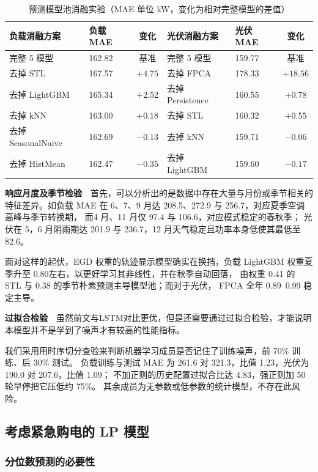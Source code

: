 \documentclass[zihao=-4,a4paper,fontset=none]{ctexart}
\begin{document}
\begin{table}[htbp]
\centering
\caption{预测模型池消融实验（MAE 单位 kW，变化为相对完整模型的差值）}
{\small
\begin{tabular}{llcllc}
\toprule
负载消融方案 & 负载MAE & 变化 & 光伏消融方案 & 光伏MAE & 变化 \\
\midrule
完整 5 模型 & 162.82 & 基准 & 完整 5 模型 & 159.77 & 基准 \\
去掉 STL & 167.57 & $+4.75$ & 去掉 FPCA & 178.33 & $+18.56$ \\
去掉 LightGBM & 165.34 & $+2.52$ & 去掉 Persistence & 160.55 & $+0.78$ \\
去掉 kNN & 163.00 & $+0.18$ & 去掉 STL & 160.32 & $+0.55$ \\
去掉 SeasonalNaive & 162.69 & $-0.13$ & 去掉 kNN & 159.71 & $-0.06$ \\
去掉 HistMean & 162.47 & $-0.35$ & 去掉 LightGBM & 159.60 & $-0.17$ \\
\bottomrule
\end{tabular}}
\label{tab:p2fablate}
\end{table}
\textbf{响应月度及季节检验}\ \ 
首先，可以分析出的是数据中存在大量与月份或季节相关的特征差异。如负载 MAE 在 6、7、9 月达 208.5、272.9 与 256.7，对应夏季空调高峰与季节转换期，
而4 月、11 月仅 97.4 与 106.6，对应模式稳定的春秋季；
光伏在 5，6 月阴雨期达 201.9 与 236.7，12 月天气稳定且功率本身低使其最低至 82.6。

面对这样的起伏，EGD 权重的轨迹显示模型确实在换挡，负载 LightGBM 权重夏季升至 0.80左右，以更好学习其非线性，并在秋季自动回落，
由权重 0.41 的 STL 与 0.38 的季节朴素预测主导模型池；而对于光伏， FPCA 全年 0.89~0.99 稳定主导。


\textbf{过拟合检验}\ \ 虽然前文与LSTM对比更优，但是还需要通过过拟合检验，才能说明本模型并不是学到了噪声才有较高的性能指标。

我们采用用时序切分查验来判断机器学习成员是否记住了训练噪声，前 70\% 训练、后 30\% 测试。
负载训练与测试 MAE 为 261.6 对 321.3，比值 1.23，光伏为 190.0 对 207.6，比值 1.09；
不加正则的历史配置过拟合比达 4.83，强正则加 50 轮早停把它压低约 75\%。
其余成员为无参数或低参数的统计模型，不存在此风险。


\subsection{考虑紧急购电的 LP 模型}
\label{sub:p2lp}

\subsubsection{分位数预测的必要性}
\label{sub:p2qneed}
\end{document}
